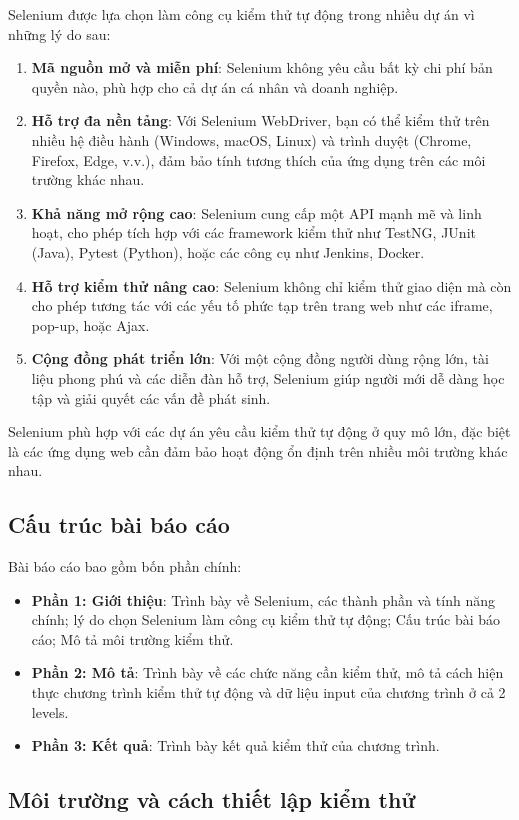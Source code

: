 Selenium được lựa chọn làm công cụ kiểm thử tự động trong nhiều dự án vì những lý do sau:
\begin{enumerate}
    \item \textbf{Mã nguồn mở và miễn phí}: Selenium không yêu cầu bất kỳ chi phí bản quyền nào, phù hợp cho cả dự án cá nhân và doanh nghiệp.
    \item \textbf{Hỗ trợ đa nền tảng}: Với Selenium WebDriver, bạn có thể kiểm thử trên nhiều hệ điều hành (Windows, macOS, Linux) và trình duyệt (Chrome, Firefox, Edge, v.v.), đảm bảo tính tương thích của ứng dụng trên các môi trường khác nhau.
    \item \textbf{Khả năng mở rộng cao}: Selenium cung cấp một API mạnh mẽ và linh hoạt, cho phép tích hợp với các framework kiểm thử như TestNG, JUnit (Java), Pytest (Python), hoặc các công cụ như Jenkins, Docker.
    \item \textbf{Hỗ trợ kiểm thử nâng cao}: Selenium không chỉ kiểm thử giao diện mà còn cho phép tương tác với các yếu tố phức tạp trên trang web như các iframe, pop-up, hoặc Ajax.
    \item \textbf{Cộng đồng phát triển lớn}: Với một cộng đồng người dùng rộng lớn, tài liệu phong phú và các diễn đàn hỗ trợ, Selenium giúp người mới dễ dàng học tập và giải quyết các vấn đề phát sinh.
\end{enumerate}

Selenium phù hợp với các dự án yêu cầu kiểm thử tự động ở quy mô lớn, đặc biệt là các ứng dụng web cần đảm bảo hoạt động ổn định trên nhiều môi trường khác nhau.

\subsection{Cấu trúc bài báo cáo}
Bài báo cáo bao gồm bốn phần chính:
\begin{itemize}
    \item \textbf{Phần 1: Giới thiệu}: Trình bày về Selenium, các thành phần và tính năng chính; lý do chọn Selenium làm công cụ kiểm thử tự động; Cấu trúc bài báo cáo; Mô tả môi trường kiểm thử.
    \item \textbf{Phần 2: Mô tả}: Trình bày về các chức năng cần kiểm thử, mô tả cách hiện thực chương trình kiểm thử tự động  và dữ liệu input của chương trình ở cả 2 levels.
    \item \textbf{Phần 3: Kết quả}: Trình bày kết quả kiểm thử của chương trình.
\end{itemize}

\subsection{Môi trường và cách thiết lập kiểm thử}
